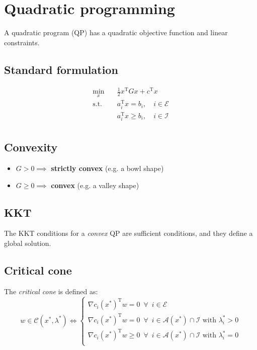 \documentclass[a4paper, 12pt]{article}
\theoremstyle{definition}
\newcommand{\T}{^{\scriptscriptstyle \text{T}}}
\newcommand{\Econ}{\mathcal{E}}
\newcommand{\Icon}{\mathcal{I}}
\newcommand{\enforall}{\enspace \forall \enspace}
\begin{document}
\section{Quadratic programming}
A quadratic program (QP) has a quadratic objective function and linear constraints.
\subsection{Standard formulation}
\begin{equation}
	\begin{aligned}
		\underset{x}{\min}	& \quad \frac{1}{2} x\T G x + c\T x \\
		\text{s.t.}         & \quad a_i\T x    = b_i, \quad i \in \Econ \\
                            & \quad a_i\T x \geq b_i, \quad i \in \Icon \\
	\end{aligned}
\end{equation}

\subsection{Convexity}
\begin{itemize}
	\item \(G > 0 \implies\) \textbf{strictly convex} (e.g. a bowl shape)
	\item \(G \geq 0 \implies\) \textbf{convex} (e.g. a valley shape)
\end{itemize}

\subsection{KKT}
The KKT conditions for a \emph{convex} QP are sufficient conditions, and they define a global solution.

\subsection{Critical cone}
The \emph{critical cone} is defined as:
\begin{equation}
	w \in \mathcal{C}(x^*, \lambda^*) \Leftrightarrow
	\begin{cases}
		\nabla c_i(x^*)\T w = 0 \enforall i \in \Econ \\
		\nabla c_i(x^*)\T w = 0 \enforall i \in \mathcal{A}(x^*) \cap \Icon \text{ with } \lambda_i^* > 0 \\
		\nabla c_i(x^*)\T w \geq 0 \enforall i \in \mathcal{A}(x^*) \cap \Icon \text{ with } \lambda_i^* = 0 \\
	\end{cases}
\end{equation}
\end{document}
